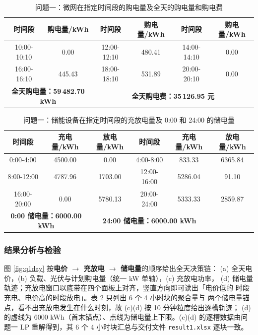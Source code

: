 \documentclass[withoutpreface]{cumcmthesis}
\renewcommand{\emph}[1]{\textbf{#1}}
\newcommand{\hd}[1]{\textbf{#1}}
\begin{document}
\begin{table}[!htbp]
  \centering
  \caption{问题一：微网在指定时间段的购电量及全天的购电量和购电费}
  \label{tab:q1t1}
  \begin{tabular}{c c c c c c}
    \toprule[1.5pt]
    \hd{时间段} & \hd{购电量/kWh} & \hd{时间段} & \hd{购电量/kWh} & \hd{时间段} & \hd{购电量/kWh}\\
    \midrule[1pt]
    10:00-10:10 & 0.00 & 12:00-12:10 & 480.41 & 14:00-14:10 & 0.00\\
    16:00-16:10 & 445.43 & 18:00-18:10 & 531.89 & 20:00-20:10 & 0.00\\
    \midrule[1pt]
    \multicolumn{2}{c}{\hd{全天购电量：59\,482.70 kWh}}
      & \multicolumn{4}{c}{\hd{全天购电费：35\,126.95 元}}\\
    \bottomrule[1.5pt]
  \end{tabular}
\end{table}

\begin{table}[!htbp]
  \centering
  \caption{问题一：储能设备在指定时间段的充放电量及 0:00 和 24:00 的储电量}
  \label{tab:q1t2}
  \begin{tabular}{c c c c c c}
    \toprule[1.5pt]
    \hd{时间段} & \hd{充电量/kWh} & \hd{放电量/kWh} & \hd{时间段} & \hd{充电量/kWh} & \hd{放电量/kWh}\\
    \midrule[1pt]
    0:00-4:00   & 4500.00 & 0.00     & 4:00-8:00   & 833.33  & 6365.84\\
    8:00-12:00  & 4787.96 & 1703.00  & 12:00-16:00 & 5286.04 & 91.10\\
    16:00-20:00 & 0.00    & 5780.13  & 20:00-24:00 & 5333.33 & 2859.87\\
    \midrule[1pt]
    \multicolumn{2}{c}{\hd{0:00 储电量：6000.00 kWh}}
      & \multicolumn{3}{c}{\hd{24:00 储电量：6000.00 kWh}}\\
    \bottomrule[1.5pt]
  \end{tabular}
\end{table}

\subsubsection{结果分析与检验}

图 \ref{fig:q1day} 按\emph{电价 $\to$ 充放电 $\to$ 储电量}的顺序给出全天决策链：
(a) 全天电价，(b) 负载、光伏与计划购电量（统一 kW 单轴），(c) 充放电功率，
(d) 储电量轨迹；充放电窗口以底带在四个面板上对齐，竖直方向即可读出「电价低的
时段充电、电价高的时段放电」。表 \ref{tab:q1t2} 只列出 6 个 4 小时块的聚合量与
两个储电量锚点，看不出充放电发生在什么时刻，故 (c)(d) 按 10 分钟粒度给出逐槽轨迹；
(d) 的虚线为 6000 kWh（首末锚点）、点线为储电量上下限。(c)(d) 的逐槽数据由问题一
LP 重解得到，其 6 个 4 小时块汇总与交付文件 \texttt{result1.xlsx} 逐块一致。
\end{document}
